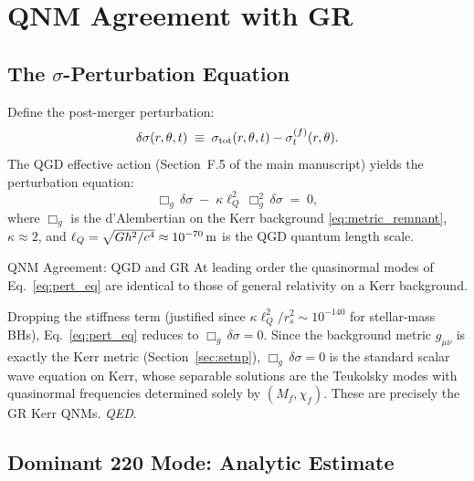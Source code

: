 \documentclass[11pt,a4paper]{article}
\theoremstyle{definition}
\theoremstyle{remark}
\newcommand{\sig}[2]{\sigma_{#1}^{(#2)}}
\newcommand{\lQ}{\ell_{Q}}
\begin{document}
	\section{QNM Agreement with GR}
	\label{sec:qnm}
	
	\subsection{The $\sigma$-Perturbation Equation}
	
	Define the post-merger perturbation:
	\begin{equation}
		\delta\sigma(r,\theta,t)
		\;\equiv\;
		\sigma_{\rm tot}(r,\theta,t) - \sig{t}{f}(r,\theta).
		\label{eq:delta_sigma_def}
	\end{equation}
	The QGD effective action (Section~F.5 of the main manuscript) yields the
	perturbation equation:
	\begin{equation}
		\boxed{
			\Box_g\,\delta\sigma
			\;-\;
			\kappa\lQ^2\,\Box_g^2\,\delta\sigma
			\;=\;0,
		}
		\label{eq:pert_eq}
	\end{equation}
	where $\Box_g$ is the d'Alembertian on the Kerr background
	\eqref{eq:metric_remnant}, $\kappa\approx2$, and
	$\lQ = \sqrt{G\hbar^2/c^4}\approx10^{-70}\,{\rm m}$ is the QGD quantum
	length scale.
	
	QNM Agreement: QGD and GR
		At leading order the quasinormal modes of
		Eq.~\eqref{eq:pert_eq} are identical to those of general relativity on
		a Kerr background.
	
		Dropping the stiffness term (justified since
		$\kappa\lQ^2/r_s^2\sim10^{-140}$ for stellar-mass BHs), Eq.~\eqref{eq:pert_eq}
		reduces to $\Box_g\,\delta\sigma=0$.  Since the background metric
		$g_{\mu\nu}$ is exactly the Kerr metric (Section~\ref{sec:setup}),
		$\Box_g\,\delta\sigma=0$ is the standard scalar wave equation on Kerr,
		whose separable solutions are the Teukolsky modes \cite{Teukolsky1973}
		with quasinormal frequencies determined solely by $(M_f,\chi_f)$.
		These are precisely the GR Kerr QNMs.  \textit{QED}.
	
	\subsection{Dominant 220 Mode: Analytic Estimate}
	
\end{document}
